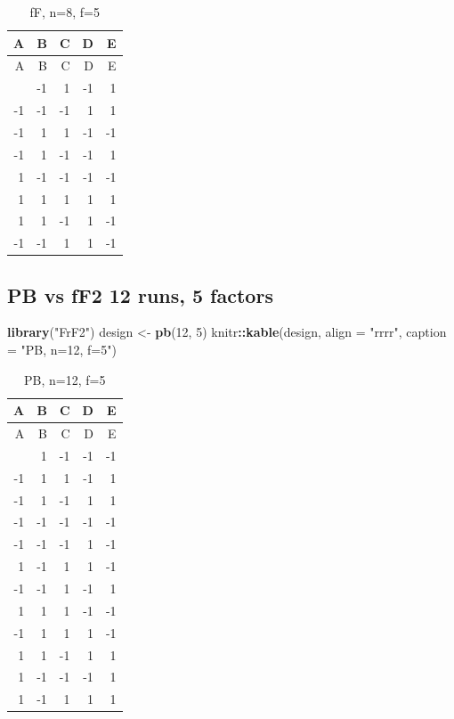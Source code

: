 \documentclass[
  12pt,
  a4paper,
]{article}
\newenvironment{Shaded}{\begin{snugshade}}{\end{snugshade}}
\newcommand{\AttributeTok}[1]{\textcolor[rgb]{0.13,0.29,0.53}{#1}}
\newcommand{\DecValTok}[1]{\textcolor[rgb]{0.00,0.00,0.81}{#1}}
\newcommand{\FunctionTok}[1]{\textcolor[rgb]{0.13,0.29,0.53}{\textbf{#1}}}
\newcommand{\NormalTok}[1]{#1}
\newcommand{\OtherTok}[1]{\textcolor[rgb]{0.56,0.35,0.01}{#1}}
\newcommand{\SpecialCharTok}[1]{\textcolor[rgb]{0.81,0.36,0.00}{\textbf{#1}}}
\newcommand{\StringTok}[1]{\textcolor[rgb]{0.31,0.60,0.02}{#1}}
\numberwithin{equation}{section}
\theoremstyle{plain}
\theoremstyle{definition}
\theoremstyle{remark}
\theoremstyle{note}
\begin{document}
\begin{longtable}[]{@{}rrrrr@{}}
\caption{fF, n=8, f=5}\tabularnewline
\toprule\noalign{}
A & B & C & D & E \\
\midrule\noalign{}
\endfirsthead
\toprule\noalign{}
A & B & C & D & E \\
\midrule\noalign{}
\endhead
\bottomrule\noalign{}
\endlastfoot
1 & -1 & 1 & -1 & 1 \\
-1 & -1 & -1 & 1 & 1 \\
-1 & 1 & 1 & -1 & -1 \\
-1 & 1 & -1 & -1 & 1 \\
1 & -1 & -1 & -1 & -1 \\
1 & 1 & 1 & 1 & 1 \\
1 & 1 & -1 & 1 & -1 \\
-1 & -1 & 1 & 1 & -1 \\
\end{longtable}

\newpage

\hypertarget{pb-vs-ff2-12-runs-5-factors}{%
\subsection{PB vs fF2 12 runs, 5
factors}\label{pb-vs-ff2-12-runs-5-factors}}

\begin{Shaded}
\begin{Highlighting}[]
\FunctionTok{library}\NormalTok{(}\StringTok{"FrF2"}\NormalTok{)}
\NormalTok{design }\OtherTok{\textless{}{-}} \FunctionTok{pb}\NormalTok{(}\DecValTok{12}\NormalTok{, }\DecValTok{5}\NormalTok{)}
\NormalTok{knitr}\SpecialCharTok{::}\FunctionTok{kable}\NormalTok{(design, }\AttributeTok{align =} \StringTok{"rrrr"}\NormalTok{, }\AttributeTok{caption =} \StringTok{"PB, n=12, f=5"}\NormalTok{)}
\end{Highlighting}
\end{Shaded}

\begin{longtable}[]{@{}rrrrr@{}}
\caption{PB, n=12, f=5}\tabularnewline
\toprule\noalign{}
A & B & C & D & E \\
\midrule\noalign{}
\endfirsthead
\toprule\noalign{}
A & B & C & D & E \\
\midrule\noalign{}
\endhead
\bottomrule\noalign{}
\endlastfoot
1 & 1 & -1 & -1 & -1 \\
-1 & 1 & 1 & -1 & 1 \\
-1 & 1 & -1 & 1 & 1 \\
-1 & -1 & -1 & -1 & -1 \\
-1 & -1 & -1 & 1 & -1 \\
1 & -1 & 1 & 1 & -1 \\
-1 & -1 & 1 & -1 & 1 \\
1 & 1 & 1 & -1 & -1 \\
-1 & 1 & 1 & 1 & -1 \\
1 & 1 & -1 & 1 & 1 \\
1 & -1 & -1 & -1 & 1 \\
1 & -1 & 1 & 1 & 1 \\
\end{longtable}
\end{document}
